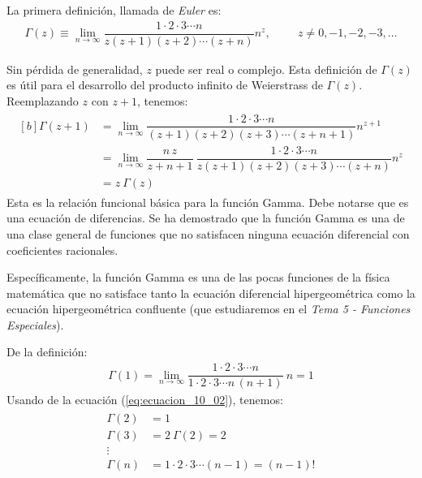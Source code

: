 La primera definición, llamada de \emph{Euler} es:
\begin{align}
\Gamma(z) \equiv \lim_{n \to \infty} \dfrac{1 \cdot 2 \cdot 3 \cdots n}{z (z+1) (z+2) \cdots (z+n)} n^{z}, \hspace{1cm} z \neq 0, -1,-2,-3, \ldots
\label{eq:ecuacion_10_01}
\end{align}

Sin pérdida de generalidad, $z$ puede ser real o complejo.  Esta definición de $\Gamma(z)$ es útil para el desarrollo del producto infinito de Weierstrass de $\Gamma (z)$. Reemplazando $z$ con $z + 1$, tenemos:
\begin{align}
\begin{aligned}[b]
\Gamma (z + 1) &= \lim_{n \to \infty} \dfrac{1 \cdot 2 \cdot 3 \cdots n}{(z + 1)(z + 2)(z + 3) \cdots (z + n + 1)} n^{z + 1} \\[0.5em]
&= \lim_{n \to \infty} \dfrac{n \, z}{z + n + 1} \: \dfrac{1 \cdot 2 \cdot 3 \cdots n}{z (z + 1)(z + 2)(z + 3) \cdots (z + n)} n^{z} \\[0.5em]
&= z \: \Gamma (z)
\label{eq:ecuacion_10_02}
\end{aligned}
\end{align}
Esta es la relación funcional básica para la función Gamma. Debe notarse que es una ecuación de diferencias. Se ha demostrado que la función Gamma es una de una clase general de funciones que no satisfacen ninguna ecuación diferencial con coeficientes racionales.
\par
Específicamente, la función Gamma es una de las pocas funciones de la física matemática que no satisface tanto la ecuación diferencial hipergeométrica como la ecuación hipergeométrica confluente (que estudiaremos en el \emph{Tema 5 - Funciones Especiales}).
\par
De la definición:
\begin{align}
\Gamma (1) = \lim_{n \to \infty} \dfrac{1 \cdot 2 \cdot 3 \cdots n}{1 \cdot 2 \cdot 3 \cdots n \, (n + 1)} \: n = 1
\label{eq:ecuacion_10_03}
\end{align}
Usando de la ecuación (\ref{eq:ecuacion_10_02}), tenemos:
\begin{align}
\begin{aligned}
\Gamma (2) &= 1 \\
\Gamma (3) &=  2 \: \Gamma(2) =  2 \\
\vdots \\
\Gamma (n) &= 1 \cdot 2 \cdot 3 \cdots (n-1) =  (n-1)!
\label{eq:ecuacion_10_04}
\end{aligned}
\end{align}

